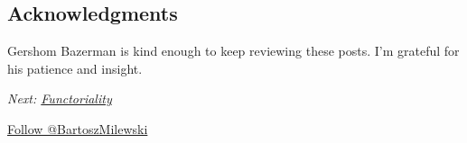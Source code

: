 \subsection{Acknowledgments}\label{acknowledgments}

Gershom Bazerman is kind enough to keep reviewing these posts. I'm
grateful for his patience and insight.

\emph{Next:
\href{https://bartoszmilewski.com/2015/02/03/functoriality/}{Functoriality}}

\href{https://twitter.com/BartoszMilewski}{Follow @BartoszMilewski}
